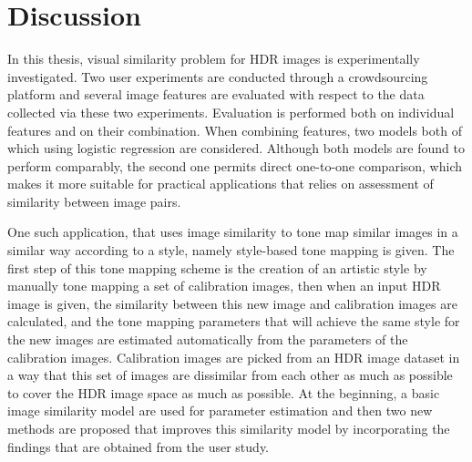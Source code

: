 \chapter{Discussion}
\label{chp:b6}

In this thesis, visual similarity problem for HDR images is experimentally investigated. Two user experiments are conducted through a crowdsourcing platform and several image features are evaluated with respect to the data collected via these two experiments. Evaluation is performed both on individual features and on their combination. When combining features, two models both of which using logistic regression are considered. Although both models are found to perform comparably, the second one permits direct one-to-one comparison, which makes it more suitable for practical applications that relies on assessment of similarity between image pairs. 

One such application, that uses image similarity to tone map similar images in a similar way according to a style, namely style-based tone mapping is given. The first step of this tone mapping scheme is the creation of an artistic style by manually tone mapping a set of calibration images, then when an input HDR image is given, the similarity between this new image and calibration images are calculated, and the tone mapping parameters that will achieve the same style for the new images are estimated automatically from the parameters of the calibration images. Calibration images are picked from an HDR image dataset in a way that this set of images are dissimilar from each other as much as possible to cover the HDR image space as much as possible. At the beginning, a basic image similarity model are used for parameter estimation and then two new methods are proposed that improves this similarity model by incorporating the findings that are obtained from the user study. 

